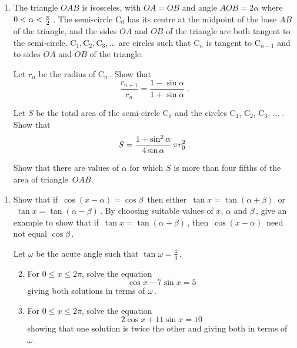 \documentclass[a4, 11pt]{report}
\newlength{\qspace}
\newcounter{qnumber}
\newenvironment{question}%
 {\vspace{\qspace}
  \begin{enumerate}[\bfseries 1\quad][10]%
    \setcounter{enumi}{\value{qnumber}}%
    \item%
 }
{
  \end{enumerate}
  \filbreak
  \stepcounter{qnumber}
 }
\newenvironment{questionparts}[1][1]%
 {
  \begin{enumerate}[\bfseries (i)]%
    \setcounter{enumii}{#1}
    \addtocounter{enumii}{-1}
    \setlength{\itemsep}{5mm}
    \setlength{\parskip}{8pt}
 }
 {
  \end{enumerate}
 }
\def\le{\leqslant}
\begin{document}
\begin{question}The triangle $OAB$ is isosceles, 
with $OA = OB$ and angle $AOB = 2 \alpha$ where $0< \alpha < {\pi \over 2}\,$. 
The semi-circle $\mathrm{C}_0$ has its centre at the midpoint of the base $AB$ of the triangle, 
and the sides $OA$ and $OB$ of the triangle are both tangent to the semi-circle. 
$\mathrm{C}_1, \mathrm{C}_2, \mathrm{C}_3, \ldots$ 
are circles such that $\mathrm{C}_n$ is tangent to $\mathrm{C}_{n-1}$ 
and to sides $OA$ and $OB$ of the triangle. 

Let $r_n$ be the radius of $\mathrm{C}_n\,$. Show that
\[
\frac{r_{n+1}}{r_n} = \frac{1-\sin\alpha}{1+\sin\alpha}\;.
\]

Let $S$ be the total area of the semi-circle $\mathrm{C}_0$ and the 
circles  $\mathrm{C}_1$, $\mathrm{C}_2$, $\mathrm{C}_3$, $\ldots\;$. 
Show that
\[
S = {1 + \sin^2 \alpha  \over 4 \sin \alpha} \, \pi r_0^2 \;.
\]

Show that there are values of $\alpha$ for which $S$ is more than four fifths 
of the area of triangle~$OAB$.
\end{question}

\begin{question}
Show that if $\, \cos(x - \alpha) = \cos \beta \,$  
then either $\, \tan x = \tan ( \alpha + \beta)\,$ or
$\; \tan x = \tan ( \alpha - \beta)\,$. 
By choosing suitable values of $x$, $\alpha$ and $\beta\,$,
give an example to show that if 
$\,\tan x = \tan ( \alpha + \beta)\,$, 
then $\,\cos(x - \alpha) \, $ need not equal $ \cos \beta \,$.

Let $\omega$ be the acute angle such that $\tan \omega = \frac 43\,$.
\begin{questionparts}
\item For $0 \le x \le 2 \pi$, solve the equation
\[
\cos x -7 \sin x = 5
\]
giving both solutions in terms of $\omega\,$.
\item  For $0 \le x \le 2 \pi$, solve the equation
\[
2\cos x + 11 \sin x = 10
\]
showing that one solution is twice the other and giving both in terms of $\omega\,$.
\end{questionparts}
	\end{question}
	
\end{document}
